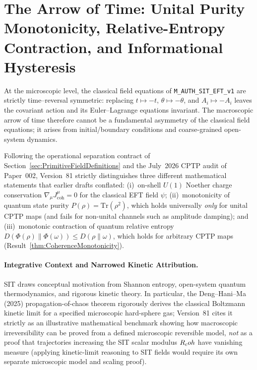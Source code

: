 \section{The Arrow of Time: Unital Purity Monotonicity, Relative-Entropy Contraction, and Informational Hysteresis}
\label{sec:arrow-of-time}
\label{sec:thermodynamics}
\label{sec:HTheoremProof}

At the microscopic level, the classical field equations of \texttt{M\_AUTH\_SIT\_EFT\_v1} are strictly time--reversal symmetric: replacing $t \mapsto -t$, $\theta \mapsto -\theta$, and $A_i \mapsto -A_i$ leaves the covariant action and its Euler--Lagrange equations invariant. The macroscopic arrow of time therefore cannot be a fundamental asymmetry of the classical field equations; it arises from initial/boundary conditions and coarse-grained open-system dynamics.

Following the operational separation contract of Section~\ref{sec:PrimitiveFieldDefinitions} and the July~2026 CPTP audit of Paper~002, Version~81 strictly distinguishes three different mathematical statements that earlier drafts conflated: (i)~on-shell $U(1)$ Noether charge conservation $\nabla_\mu J^\mu_{\mathrm{coh}} = 0$ for the classical EFT field $\psi$; (ii)~monotonicity of quantum state purity $P(\rho) = \mathrm{Tr}(\rho^2)$, which holds universally \emph{only} for unital CPTP maps (and fails for non-unital channels such as amplitude damping); and (iii)~monotonic contraction of quantum relative entropy $D(\Phi(\rho)\|\Phi(\omega)) \le D(\rho\|\omega)$, which holds for arbitrary CPTP maps (Result~\ref{thm:CoherenceMonotonicity}).

\paragraph{Integrative Context and Narrowed Kinetic Attribution.}
SIT draws conceptual motivation from Shannon entropy, open-system quantum thermodynamics, and rigorous kinetic theory. In particular, the Deng--Hani--Ma (2025) propagation-of-chaos theorem rigorously derives the classical Boltzmann kinetic limit for a specified microscopic hard-sphere gas; Version~81 cites it strictly as an illustrative mathematical benchmark showing how macroscopic irreversibility can be proved from a defined microscopic reversible model, \emph{not} as a proof that trajectories increasing the SIT scalar modulus $R_coh$ have vanishing measure (applying kinetic-limit reasoning to SIT fields would require its own separate microscopic model and scaling proof).

